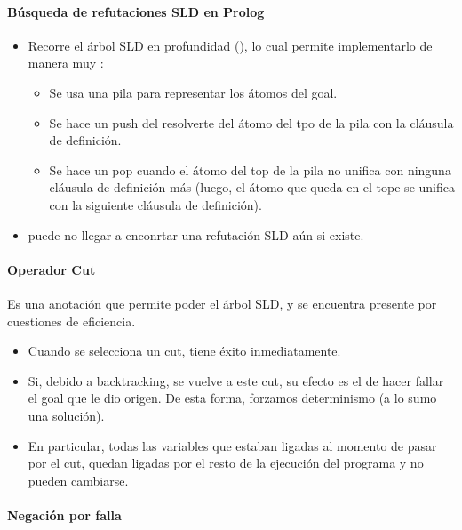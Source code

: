 \paragraph{Búsqueda de refutaciones SLD en Prolog}
\begin{itemize}
  \item Recorre el árbol SLD en profundidad (), lo cual permite implementarlo de manera muy :
  \begin{itemize}
    \item Se usa una pila para representar los átomos del goal.
    \item Se hace un push del resolverte del átomo del tpo de la pila con la cláusula de definición.
    \item Se hace un pop cuando el átomo del top de la pila no unifica con ninguna cláusula de definición más (luego, el átomo que queda en el tope se unifica con la siguiente cláusula de definición).
  \end{itemize}
  \item {} puede no llegar a enconrtar una refutación SLD aún si existe.
\end{itemize}

\paragraph{Operador Cut}

Es una anotación que permite poder el árbol SLD, y se encuentra presente por cuestiones de eficiencia.

\begin{itemize}
  \item Cuando se selecciona un cut, tiene éxito inmediatamente.
  \item Si, debido a backtracking, se vuelve a este cut, su efecto es el de hacer fallar el goal que le dio origen. De esta forma, forzamos determinismo (a lo sumo una solución).
  \item En particular, todas las variables que estaban ligadas al momento de pasar por el cut, quedan ligadas por el resto de la ejecución del programa y no pueden cambiarse.
\end{itemize}

\paragraph{Negación por falla}

